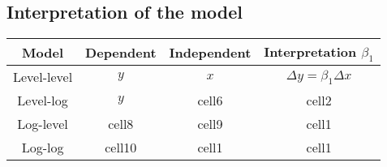 \documentclass[10pt,landscape]{article}
\begin{document}
\begin{multicols}{3}
\subsection*{Interpretation of the model}


\begin{tabular}{ | c | c | c | c | }
	\hline
	Model & Dependent & Independent & Interpretation $\beta_1$ \\
	\hline
	Level-level & $y$ & $x$ & $\Delta y = \beta_1 \Delta x$ \\ 
	\hline
	Level-log & $y$ & cell6 & cell2 \\  
	\hline
	Log-level & cell8 & cell9 & cell1 \\
	\hline
	Log-log & cell10 & cell1 & cell1 \\
	\hline
\end{tabular}


\lipsum
\end{multicols}
\end{document}
